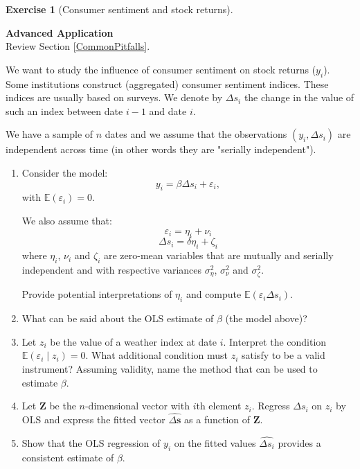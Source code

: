 \documentclass[
  11pt,
]{book}
\theoremstyle{definition}
\theoremstyle{definition}
\theoremstyle{definition}
\newtheorem{exercise}{Exercise}[chapter]
\theoremstyle{definition}
\theoremstyle{remark}
\begin{document}

\begin{exercisebox}

\begin{exercise}[Consumer sentiment and stock returns]
\protect\hypertarget{exr:regressions-sentiment-returns}{}\label{exr:regressions-sentiment-returns}

\textbf{Advanced \textbar{} Application}\\
Review Section \ref{CommonPitfalls}.

We want to study the influence of consumer sentiment on stock returns (\(y_i\)). Some institutions construct (aggregated) consumer sentiment indices. These indices are usually based on surveys. We denote by \(\Delta s_i\) the change in the value of such an index between date \(i - 1\) and date \(i\).

We have a sample of \(n\) dates and we assume that the observations \((y_i, \Delta s_i)\) are independent across time (in other words they are "serially independent").

\begin{enumerate}
\def\labelenumi{\arabic{enumi}.}
\item
  Consider the model: \[        y_i = \beta \Delta s_i + \varepsilon_i,\] with \(\mathbb{E}(\varepsilon_i) = 0\).

  We also assume that: \[\varepsilon_i = \eta_i + \nu_i\] \[\Delta s_i = \delta \eta_i + \zeta_i\] where \(\eta_i\), \(\nu_i\) and \(\zeta_i\) are zero-mean variables that are mutually and serially independent and with respective variances \(\sigma_\eta^2\), \(\sigma_\nu^2\) and \(\sigma_\zeta^2\).

  Provide potential interpretations of \(\eta_i\) and compute \(\mathbb{E}(\varepsilon_i \Delta s_i)\).
\item
  What can be said about the OLS estimate of \(\beta\) (the model above)?
\item
  Let \(z_i\) be the value of a weather index at date \(i\). Interpret the condition \(\mathbb{E}(\varepsilon_i\mid z_i)=0\). What additional condition must \(z_i\) satisfy to be a valid instrument? Assuming validity, name the method that can be used to estimate \(\beta\).
\item
  Let \(\mathbf Z\) be the \(n\)-dimensional vector with \(i\)th element \(z_i\). Regress \(\Delta s_i\) on \(z_i\) by OLS and express the fitted vector \(\widehat{\Delta\mathbf s}\) as a function of \(\mathbf Z\).
\item
  Show that the OLS regression of \(y_i\) on the fitted values \(\widehat{\Delta s_i}\) provides a consistent estimate of \(\beta\).
\end{enumerate}

\end{exercise}

\end{exercisebox}
\end{document}
